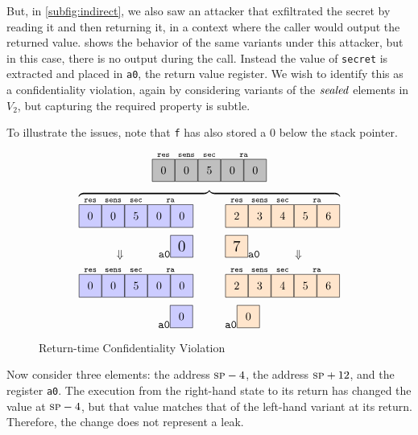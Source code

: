 \documentclass[10pt,conference]{ieeetran}%
\theoremstyle{definition}
\begin{document}
But, in \cref{subfig:indirect}, we also saw an attacker that exfiltrated the secret
by reading it and then returning it, in a context where the caller would output the returned
value.  shows the behavior of the same variants under this attacker,
but in this case, there is no output during the call. Instead the value of {\tt secret} is
extracted and placed in {\tt a0}, the return value register. We wish to identify this as
a confidentiality violation, again by considering variants of the \(\mathit{sealed}\)
elements in \(V_2\), but capturing the required property is subtle.

To illustrate the issues, note that {\tt f} has also stored a 0 below the stack pointer.
%
\begin{figure}
    \centering
    \[
    \stackrel{\texttt{res}}{\numbox[0]}
    \stackrel{\texttt{sens}}{\numbox[0]}
    \stackrel{\texttt{sec}}{\numbox[5]}
    \stackrel{\texttt{ra}}{\numbox[0]\numbox[0]}\]
    \[\overbrace{
    \stackrel{\texttt{res}}{\leftbox[0]}
    \stackrel{\texttt{sens}}{\leftbox[0]}
    \stackrel{\texttt{sec}}{\leftbox[5]}
    \stackrel{\texttt{ra}}{\leftbox[0]\leftbox[0]}
    \hspace{1cm}
    \stackrel{\texttt{res}}{\rightbox[2]}
    \stackrel{\texttt{sens}}{\rightbox[3]}
    \stackrel{\texttt{sec}}{\rightbox[4]}
    \stackrel{\texttt{ra}}{\rightbox[5]\rightbox[6]}}
    \]
    \[\large\Downarrow \hspace{1cm} \mathtt{a0} \leftbox[0] \hspace{1cm}
    \rightbox[7] \mathtt{a0} \hspace{1cm} \large\Downarrow\]
    \[
    \stackrel{\texttt{res}}{\leftbox[0]}
    \stackrel{\texttt{sens}}{\leftbox[0]}
    \stackrel{\texttt{sec}}{\leftbox[5]}
    \stackrel{\texttt{ra}}{\leftbox[0]\leftbox[0]}
    \hspace{1cm}
    \stackrel{\texttt{res}}{\rightbox[2]}
    \stackrel{\texttt{sens}}{\rightbox[3]}
    \stackrel{\texttt{sec}}{\rightbox[4]}
    \stackrel{\texttt{ra}}{\rightbox[5]\rightbox[6]}
    \]
    \[\mathtt{a0} \leftbox[0] \hspace{1cm}
    \mathtt{a0} \rightbox[0]\]
  \caption{Return-time Confidentiality Violation}
  \label{fig:variant3}
\end{figure}
%
Now consider three elements: the address \(\textsc{sp} - 4\), the address \(\textsc{sp} + 12\),
and the register {\tt a0}. The execution from the right-hand state to its return
has changed the value at \(\textsc{sp} - 4\), but that value matches that of the
left-hand variant at its return. Therefore, the change does not represent a leak.
\end{document}
